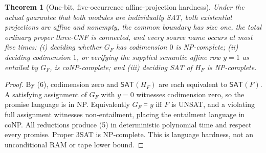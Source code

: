 \documentclass[11pt]{article}
\newtheorem{theorem}{Theorem}
\newcommand{\SAT}{\mathsf{SAT}}
\begin{document}
\begin{theorem}[One-bit, five-occurrence affine-projection hardness]\label{th:hard}
Under the \emph{actual} guarantee that both modules are individually SAT, both existential projections are affine and nonempty, the common boundary has size one, the total ordinary proper three-CNF is connected, and every source name occurs at most five times: (i) deciding whether $G_F$ has codimension $0$ is NP-complete; (ii) deciding codimension $1$, or verifying the supplied semantic affine row $y=1$ as entailed by $G_F$, is coNP-complete; and (iii) deciding SAT of $H_F$ is NP-complete.
\end{theorem}
\begin{proof}
By (6), codimension zero and $\SAT(H_F)$ are each equivalent to $\SAT(F)$. A satisfying assignment of $G_F$ with $y=0$ witnesses codimension zero, so the promise language is in NP. Equivalently $G_F\models y$ iff $F$ is UNSAT, and a violating full assignment witnesses non-entailment, placing the entailment language in coNP. All reductions produce (5) in deterministic polynomial time and respect every promise. Proper 3SAT is NP-complete. This is language hardness, not an unconditional RAM or tape lower bound.
\end{proof}
\end{document}
